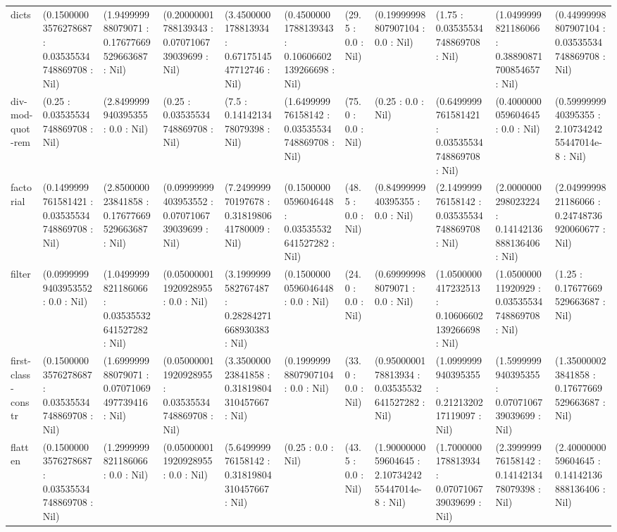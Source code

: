 \begin{table}
\begin{tabular}{lllllllllll}
dicts & (0.15000003576278687 : 0.03535534748869708 : Nil) & (1.949999988079071 : 0.17677669529663687 : Nil) & (0.20000001788139343 : 0.0707106739039699 : Nil) & (3.4500000178813934 : 0.6717514547712746 : Nil) & (0.45000001788139343 : 0.10606602139266698 : Nil) & (29.5 : 0.0 : Nil) & (0.19999998807907104 : 0.0 : Nil) & (1.75 : 0.03535534748869708 : Nil) & (1.0499999821186066 : 0.38890871700854657 : Nil) & (0.44999998807907104 : 0.03535534748869708 : Nil) \\
div-mod-quot-rem & (0.25 : 0.03535534748869708 : Nil) & (2.8499999940395355 : 0.0 : Nil) & (0.25 : 0.03535534748869708 : Nil) & (7.5 : 0.1414213478079398 : Nil) & (1.649999976158142 : 0.03535534748869708 : Nil) & (75.0 : 0.0 : Nil) & (0.25 : 0.0 : Nil) & (0.6499999761581421 : 0.03535534748869708 : Nil) & (0.4000000059604645 : 0.0 : Nil) & (0.5999999940395355 : 2.1073424255447014e-8 : Nil) \\
factorial & (0.1499999761581421 : 0.03535534748869708 : Nil) & (2.850000023841858 : 0.17677669529663687 : Nil) & (0.09999999403953552 : 0.0707106739039699 : Nil) & (7.249999970197678 : 0.3181980641780009 : Nil) & (0.15000000596046448 : 0.03535532641527282 : Nil) & (48.5 : 0.0 : Nil) & (0.8499999940395355 : 0.0 : Nil) & (2.149999976158142 : 0.03535534748869708 : Nil) & (2.0000000298023224 : 0.14142136888136406 : Nil) & (2.0499999821186066 : 0.24748736920060677 : Nil) \\
filter & (0.09999999403953552 : 0.0 : Nil) & (1.0499999821186066 : 0.03535532641527282 : Nil) & (0.050000011920928955 : 0.0 : Nil) & (3.1999999582767487 : 0.28284271668930383 : Nil) & (0.15000000596046448 : 0.0 : Nil) & (24.0 : 0.0 : Nil) & (0.699999988079071 : 0.0 : Nil) & (1.0500000417232513 : 0.10606602139266698 : Nil) & (1.050000011920929 : 0.03535534748869708 : Nil) & (1.25 : 0.17677669529663687 : Nil) \\
first-class-constr & (0.15000003576278687 : 0.03535534748869708 : Nil) & (1.699999988079071 : 0.07071069497739416 : Nil) & (0.050000011920928955 : 0.03535534748869708 : Nil) & (3.350000023841858 : 0.31819804310457667 : Nil) & (0.19999998807907104 : 0.0 : Nil) & (33.0 : 0.0 : Nil) & (0.9500000178813934 : 0.03535532641527282 : Nil) & (1.0999999940395355 : 0.2121320217119097 : Nil) & (1.5999999940395355 : 0.0707106739039699 : Nil) & (1.350000023841858 : 0.17677669529663687 : Nil) \\
flatten & (0.15000003576278687 : 0.03535534748869708 : Nil) & (1.2999999821186066 : 0.0 : Nil) & (0.050000011920928955 : 0.0 : Nil) & (5.649999976158142 : 0.31819804310457667 : Nil) & (0.25 : 0.0 : Nil) & (43.5 : 0.0 : Nil) & (1.9000000059604645 : 2.1073424255447014e-8 : Nil) & (1.7000000178813934 : 0.0707106739039699 : Nil) & (2.399999976158142 : 0.1414213478079398 : Nil) & (2.4000000059604645 : 0.14142136888136406 : Nil) \\

\end{tabular}
\end{table}
